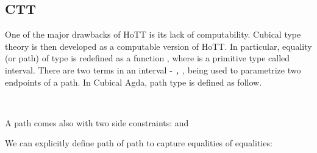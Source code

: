 \subsection*{CTT}

One of the major drawbacks of HoTT is its lack of computability. Cubical type theory is then developed as a computable version of HoTT. In particular, equality (or path) of type  is redefined as a function   , where  is a primitive type called interval. There are two terms in an interval -  \texttt{,}  \AgdaSymbol{:} , being used to parametrize two endpoints of a path. In Cubical Agda, path type is defined as follow.

\begin{code}[hide]%
\>[0]\AgdaSpace{}%
\AgdaModule{\AgdaUnderscore{}}\AgdaSpace{}%
\AgdaSymbol{\{}\AgdaSpace{}%
\AgdaSymbol{:}\AgdaSpace{}%
\AgdaSymbol{\}}\AgdaSpace{}%
\<%
\end{code}

\begin{code}%
\>[0][@{}l@{\AgdaIndent{1}}]%
\>[2]\AgdaSpace{}%
\AgdaSymbol{:}\AgdaSpace{}%
\AgdaSymbol{(}\AgdaSpace{}%
\AgdaSymbol{:}\AgdaSpace{}%
\AgdaSymbol{)}\AgdaSpace{}%
\AgdaSpace{}%
%
\>[25]\AgdaSpace{}%
\AgdaSpace{}%
\AgdaSpace{}%
\<%
\\
%
\>[2]\AgdaSpace{}%
\AgdaSpace{}%
\AgdaSpace{}%
\AgdaSpace{}%
\AgdaSymbol{=}\AgdaSpace{}%
\AgdaSpace{}%
\AgdaSpace{}%
\<%
\end{code}

A path  comes also with two side constraints: \AgdaSymbol{= } and \AgdaSymbol{= }

We can explicitly define path of path to capture equalities of equalities:

